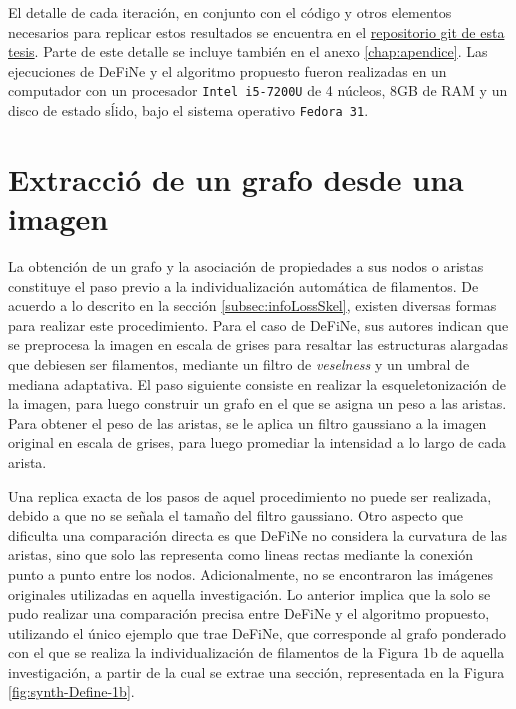El detalle de cada iteraci\'on, en conjunto con el c\'odigo y otros elementos necesarios para replicar estos resultados se encuentra en el \href{https://gitlab.com/LeoXDXp/graph-crawler}{repositorio git de esta tesis}. Parte de este detalle se incluye tambi\'en en el anexo \ref{chap:apendice}.
Las ejecuciones de DeFiNe y el algoritmo propuesto fueron realizadas en un computador con un procesador {\tt Intel i5-7200U} de 4 n\'ucleos, 8GB de RAM y un disco de estado s\'lido, bajo el sistema operativo {\tt Fedora 31}.

\section{Extracci\'o de un grafo desde una imagen}
\label{sec:graphImageExtraction}
La obtenci\'on de un grafo y la asociaci\'on de propiedades a sus nodos o aristas constituye el paso previo a la individualizaci\'on autom\'atica de filamentos. De acuerdo a lo descrito en la secci\'on \ref{subsec:infoLossSkel}, existen diversas formas para realizar este procedimiento. Para el caso de DeFiNe, sus autores indican que se preprocesa la imagen en escala de grises para resaltar las estructuras alargadas que debiesen ser filamentos, mediante un filtro de {\it veselness} y un umbral de mediana adaptativa. El paso siguiente consiste en realizar la esqueletonizaci\'on de la imagen, para luego construir un grafo en el que se asigna un peso a las aristas. 
Para obtener el peso de las aristas, se le aplica un filtro gaussiano a la imagen original en escala de grises, para luego promediar la intensidad a lo largo de cada arista.


Una replica exacta de los pasos de aquel procedimiento no puede ser realizada, debido a que no se se\~nala el tama\~no del filtro gaussiano. Otro aspecto que dificulta una comparaci\'on directa es que DeFiNe no considera la curvatura de las aristas, sino que solo las representa como lineas rectas mediante la conexión punto a punto entre los nodos. Adicionalmente, no se encontraron las im\'agenes originales utilizadas en aquella investigaci\'on. Lo anterior implica que la solo se pudo realizar una comparaci\'on precisa entre DeFiNe y el algoritmo propuesto, utilizando el \'unico ejemplo que trae DeFiNe, que corresponde al grafo ponderado con el que se realiza la individualizaci\'on de filamentos de la Figura 1b de aquella investigaci\'on, a partir de la cual se extrae una secci\'on, representada en la Figura \ref{fig:synth-Define-1b}.


